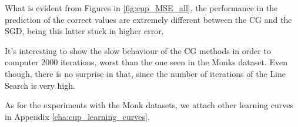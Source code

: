         What is evident from Figures in \ref{fig:cup_MSE_all}, the performance in the prediction of the correct values are extremely different between the CG and the SGD, being this latter stuck in higher error.

        It's interesting to show the slow behaviour of the CG methods in order to computer 2000 iterations, worst than the one seen in the Monks dataset. Even though, there is no surprise in that, since the number of iterations of the Line Search is very high.

        As for the experiments with the Monk datasets, we attach other learning curves in Appendix \ref{cha:cup_learning_curves}.


